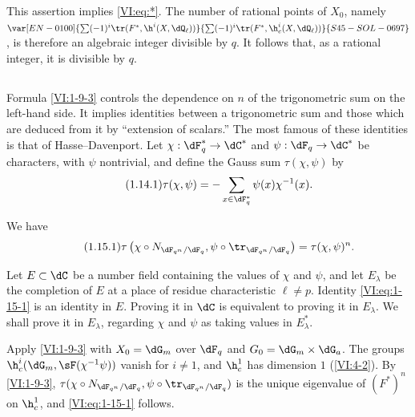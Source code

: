 This assertion implies \eqref{VI:eq:*}. The number of rational points of 
$X_0$, namely $\var[EN-0100]{\sum (-1)^i \tr(F^\ast,\h^i(X,\dQ_\ell))}{\sum (-1)^i \tr(F^\ast,\h_c^i(X,\dQ_\ell))}{S45-SOL-0697}$, is therefore an 
algebraic integer divisible by $q$. It follows that, as a rational integer, 
it is divisible by $q$. 






\subsection{}\label{VI:1-14}

Formula \ref{VI:1-9-3} controls the dependence on $n$ of the trigonometric 
sum on the left-hand side. It implies identities between a 
trigonometric sum and those which are deduced from it by ``extension of 
scalars.'' The most famous of these identities is that of 
Hasse--Davenport. Let $\chi:\dF_q^\ast \to \dC^\ast$ and 
$\psi:\dF_q\to \dC^\ast$ be characters, with $\psi$ nontrivial, and 
define the Gauss sum $\tau(\chi,\psi)$ by 
\begin{equation*}\tag{1.14.1}\label{VI:eq:1-14-1}
  \tau(\chi,\psi) = - \sum_{x\in \dF_q^\ast} \psi(x) \chi^{-1}(x) \text{.}
\end{equation*}





\begin{theorem_}\label{VI:1-15}
We have 
\begin{equation*}\tag{1.15.1}\label{VI:eq:1-15-1}
  \tau\left(\chi\circ N_{\dF_{q^n}/\dF_q},\psi\circ \tr_{\dF_{q^n}/\dF_q}\right) = \tau(\chi,\psi)^n \text{.}
\end{equation*}
\end{theorem_}

Let $E\subset \dC$ be a number field containing the values of $\chi$ and 
$\psi$, and let $E_\lambda$ be the completion of $E$ at a place of residue 
characteristic $\ell\ne p$. Identity \eqref{VI:eq:1-15-1} is an identity in 
$E$. Proving it in $\dC$ is equivalent to proving it in $E_\lambda$. We 
shall prove it in $E_\lambda$, regarding $\chi$ and $\psi$ as taking values 
in $E_\lambda^\ast$.

Apply \ref{VI:1-9-3} with $X_0=\dG_m$ over $\dF_q$ and 
$G_0=\dG_m\times \dG_a$. The groups $\h_c^i(\dG_m,\sF(\chi^{-1}\psi))$ vanish for 
$i\ne 1$, and $\h_c^1$ has dimension $1$ (\ref{VI:4-2}). By 
\ref{VI:1-9-3}, 
$\tau(\chi\circ N_{\dF_{q^n}/\dF_q},\psi\circ \tr_{\dF_{q^n}/\dF_q})$ is 
the unique eigenvalue of $(F^\ast)^n$ on $\h_c^1$, and \eqref{VI:eq:1-15-1} 
follows. 

